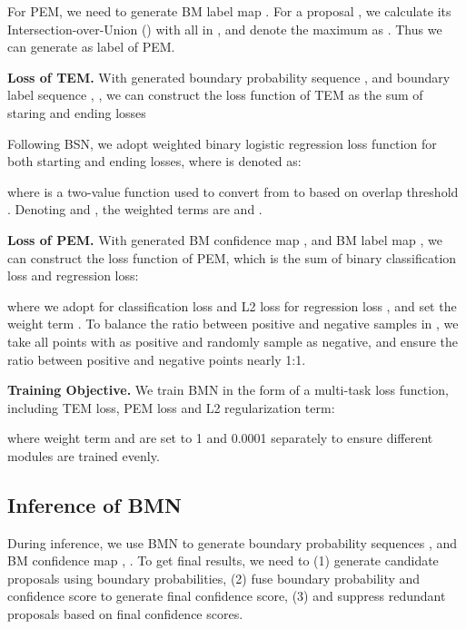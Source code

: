 \documentclass[10pt,twocolumn,letterpaper]{article}
\begin{document}
For PEM, we need to generate BM  label map .
For a proposal , we calculate its Intersection-over-Union () with all  in , and denote the maximum  as .
Thus we can generate  as label of PEM.

\noindent
\textbf{Loss of TEM.}
With generated boundary probability sequence ,  and boundary label sequence , , we can construct the  loss function of TEM  as the sum of staring and ending losses



Following BSN\cite{lin2018bsn}, we adopt weighted binary logistic regression loss function  for both starting and ending losses, where  is denoted as:

\begin{small}

\end{small}
where  is a two-value function used to convert   from  to  based on  overlap threshold .  
Denoting  and , the weighted terms are  and .



\noindent
\textbf{Loss of PEM.}
With generated BM confidence map ,  and BM label map , we can construct the loss function of PEM, which is the sum of binary classification loss and regression loss:



where we adopt  for classification loss  and L2 loss for regression loss , and set the weight term . 
To balance the ratio between positive and negative samples in , we take all points with  as positive and randomly sample   as negative, and ensure the ratio between positive and negative points nearly 1:1.


\noindent
\textbf{Training Objective.}
We train BMN  in the form of a multi-task loss function, including TEM loss, PEM loss and L2 regularization term:



where weight term  and  are set to 1 and 0.0001 separately to ensure different modules are trained evenly.



\subsection{Inference of BMN}

During inference, we use BMN to generate boundary probability sequences ,  and BM confidence map , . To get final results, we need to (1) generate candidate proposals using boundary probabilities, (2) fuse boundary probability and confidence score to generate final confidence score, (3) and suppress redundant proposals based on final confidence scores. 
\end{document}
